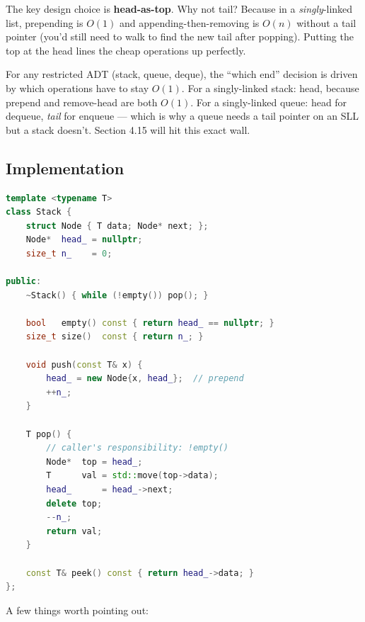 \documentclass[11pt]{article}
\begin{document}
The key design choice is \textbf{head-as-top}. Why not tail?
Because in a \emph{singly}-linked list, prepending is $O(1)$ and
appending-then-removing is $O(n)$ without a tail pointer (you'd
still need to walk to find the new tail after popping). Putting
the top at the head lines the cheap operations up perfectly.

\begin{ideabox}
For any restricted ADT (stack, queue, deque), the ``which end''
decision is driven by which operations have to stay $O(1)$. For
a singly-linked stack: head, because prepend and remove-head are
both $O(1)$. For a singly-linked queue: head for dequeue,
\emph{tail} for enqueue --- which is why a queue needs a tail
pointer on an SLL but a stack doesn't. Section 4.15 will hit this
exact wall.
\end{ideabox}

\subsection*{Implementation}

\begin{examplebox}
\begin{lstlisting}[language=C++,basicstyle=\ttfamily\small,frame=single]
template <typename T>
class Stack {
    struct Node { T data; Node* next; };
    Node*  head_ = nullptr;
    size_t n_    = 0;

public:
    ~Stack() { while (!empty()) pop(); }

    bool   empty() const { return head_ == nullptr; }
    size_t size()  const { return n_; }

    void push(const T& x) {
        head_ = new Node{x, head_};  // prepend
        ++n_;
    }

    T pop() {
        // caller's responsibility: !empty()
        Node*  top = head_;
        T      val = std::move(top->data);
        head_      = head_->next;
        delete top;
        --n_;
        return val;
    }

    const T& peek() const { return head_->data; }
};
\end{lstlisting}
\end{examplebox}

A few things worth pointing out:
\end{document}
